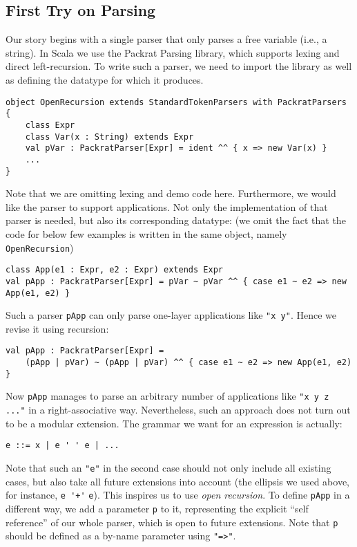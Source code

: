 \subsection{First Try on Parsing}\label{sec:firsttry}

Our story begins with a single parser that only parses a free variable (i.e., a string). In Scala we use the Packrat Parsing
library, which supports lexing and direct left-recursion. To write such a parser, we need to import the library as
well as defining the datatype for which it produces.

\begin{lstlisting}
object OpenRecursion extends StandardTokenParsers with PackratParsers {
    class Expr
    class Var(x : String) extends Expr
    val pVar : PackratParser[Expr] = ident ^^ { x => new Var(x) }
    ...
}
\end{lstlisting}
Note that we are omitting lexing and demo code here. Furthermore, we would like the parser to support applications.
Not only the implementation of that parser is needed, but also its corresponding datatype: (we omit the fact that the code for below few
examples is written in the same object, namely \lstinline{OpenRecursion})
\begin{lstlisting}
class App(e1 : Expr, e2 : Expr) extends Expr
val pApp : PackratParser[Expr] = pVar ~ pVar ^^ { case e1 ~ e2 => new App(e1, e2) }
\end{lstlisting}
Such a parser \lstinline{pApp} can only parse one-layer applications like \lstinline{"x y"}. Hence we revise it using recursion:
\begin{lstlisting}
val pApp : PackratParser[Expr] =
    (pApp | pVar) ~ (pApp | pVar) ^^ { case e1 ~ e2 => new App(e1, e2) }
\end{lstlisting}
Now \lstinline{pApp} manages to parse an arbitrary number of applications like \lstinline{"x y z ..."} in a right-associative way.
Nevertheless, such an approach does not turn out to be a modular extension. The grammar we want for an expression is actually:
\begin{lstlisting}
e ::= x | e ' ' e | ...
\end{lstlisting}
Note that such an \lstinline{"e"} in the second case should not only include all existing cases, but also take all future extensions into account (the ellipsis we used above, for instance, \lstinline{e '+'} \lstinline{e}). This inspires us to use \textit{open recursion}. To define \lstinline{pApp} in a different way, we add a parameter \lstinline{p} to it, representing the explicit ``self reference'' of our whole parser, which is open to future extensions. Note that \lstinline{p} should be defined as a by-name parameter using \lstinline{"=>"}.
